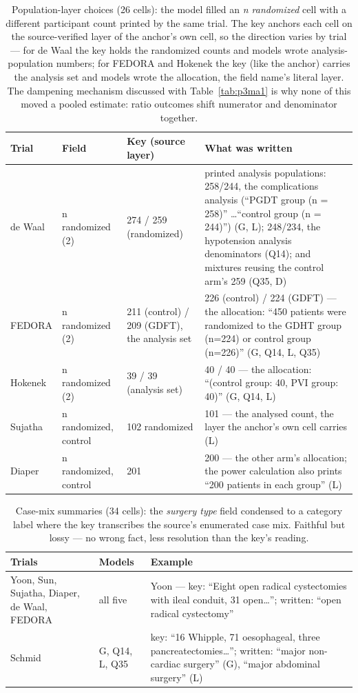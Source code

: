 \documentclass[11pt]{article}
\begin{document}
\begin{table}[H]
\centering\footnotesize
\caption{Population-layer choices (26 cells): the model filled an \emph{n randomized} cell with a different participant count printed by the same trial. The key anchors each cell on the source-verified layer of the anchor's own cell, so the direction varies by trial --- for de Waal the key holds the randomized counts and models wrote analysis-population numbers; for FEDORA and Hokenek the key (like the anchor) carries the analysis set and models wrote the allocation, the field name's literal layer. The dampening mechanism discussed with Table~\ref{tab:p3ma1} is why none of this moved a pooled estimate: ratio outcomes shift numerator and denominator together.}
\setlength{\tabcolsep}{4pt}
\begin{tabular}{p{2.0cm}p{2.7cm}p{3.4cm}p{6.1cm}}
\toprule
Trial & Field & Key (source layer) & What was written \\
\midrule
de Waal & n randomized (2) & 274 / 259 (randomized) & printed analysis populations: 258/244, the complications analysis (``PGDT group (n = 258)'' \ldots ``control group (n = 244)'') (G, L); 248/234, the hypotension analysis denominators (Q14); and mixtures reusing the control arm's 259 (Q35, D) \\
FEDORA & n randomized (2) & 211 (control) / 209 (GDFT), the analysis set & 226 (control) / 224 (GDFT) --- the allocation: ``450 patients were randomized to the GDHT group (n=224) or control group (n=226)'' (G, Q14, L, Q35) \\
Hokenek & n randomized (2) & 39 / 39 (analysis set) & 40 / 40 --- the allocation: ``(control group: 40, PVI group: 40)'' (G, Q14, L) \\
Sujatha & n randomized, control & 102 randomized & 101 --- the analysed count, the layer the anchor's own cell carries (L) \\
Diaper & n randomized, control & 201 & 200 --- the other arm's allocation; the power calculation also prints ``200 patients in each group'' (L) \\
\bottomrule
\end{tabular}
\end{table}

\begin{table}[H]
\centering\footnotesize
\caption{Case-mix summaries (34 cells): the \emph{surgery type} field condensed to a category label where the key transcribes the source's enumerated case mix. Faithful but lossy --- no wrong fact, less resolution than the key's reading.}
\setlength{\tabcolsep}{4pt}
\begin{tabular}{p{5.6cm}p{2.4cm}p{6.2cm}}
\toprule
Trials & Models & Example \\
\midrule
Yoon, Sun, Sujatha, Diaper, de Waal, FEDORA & all five & Yoon --- key: ``Eight open radical cystectomies with ileal conduit, 31 open\ldots''; written: ``open radical cystectomy'' \\
Schmid & G, Q14, L, Q35 & key: ``16 Whipple, 71 oesophageal, three pancreatectomies\ldots''; written: ``major non-cardiac surgery'' (G), ``major abdominal surgery'' (L) \\
\bottomrule
\end{tabular}
\end{table}
\end{document}
